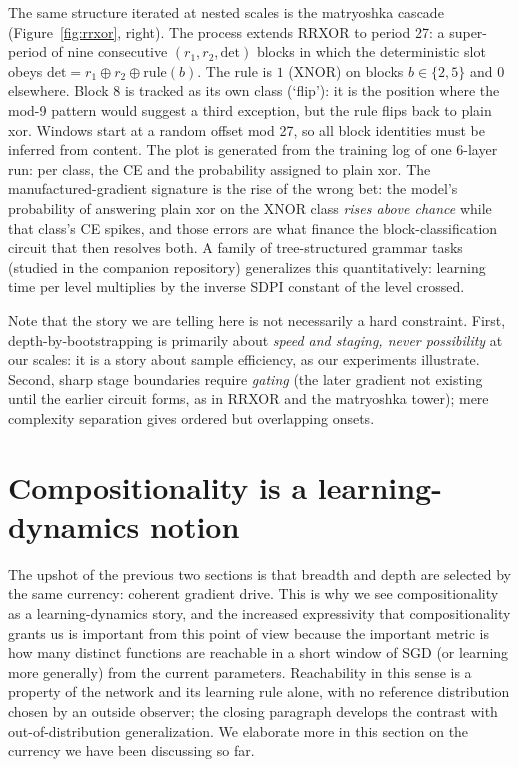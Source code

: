 \documentclass[10pt]{article}
\theoremstyle{definition}
\begin{document}
The same structure iterated at nested scales is the matryoshka cascade (Figure~\ref{fig:rrxor}, right). The process extends RRXOR to period 27: a super-period of nine consecutive $(r_1, r_2, \text{det})$ blocks in which the deterministic slot obeys $\text{det} = r_1 \oplus r_2 \oplus \text{rule}(b)$. The rule is $1$ (XNOR) on blocks $b \in \{2, 5\}$ and $0$ elsewhere. Block $8$ is tracked as its own class (`flip'): it is the position where the mod-9 pattern would suggest a third exception, but the rule flips back to plain xor. Windows start at a random offset mod 27, so all block identities must be inferred from content. The plot is generated from the training log of one 6-layer run: per class, the CE and the probability assigned to plain xor. The manufactured-gradient signature is the rise of the wrong bet: the model's probability of answering plain xor on the XNOR class \emph{rises above chance} while that class's CE spikes, and those errors are what finance the block-classification circuit that then resolves both. A family of tree-structured grammar tasks (studied in the companion repository) generalizes this quantitatively: learning time per level multiplies by the inverse SDPI constant of the level crossed.

Note that the story we are telling here is not necessarily a hard constraint. First, depth-by-bootstrapping is primarily about \emph{speed and staging, never possibility} at our scales: it is a story about sample efficiency, as our experiments illustrate. Second, sharp stage boundaries require \emph{gating} (the later gradient not existing until the earlier circuit forms, as in RRXOR and the matryoshka tower); mere complexity separation gives ordered but overlapping onsets.

\section{Compositionality is a learning-dynamics notion}\label{sec:ease}

The upshot of the previous two sections is that breadth and depth are selected by the same currency: coherent gradient drive. This is why we see compositionality as a learning-dynamics story, and the increased expressivity that compositionality grants us is important from this point of view because the important metric is how many distinct functions are reachable in a short window of SGD (or learning more generally) from the current parameters. Reachability in this sense is a property of the network and its learning rule alone, with no reference distribution chosen by an outside observer; the closing paragraph develops the contrast with out-of-distribution generalization. We elaborate more in this section on the currency we have been discussing so far.
\end{document}

